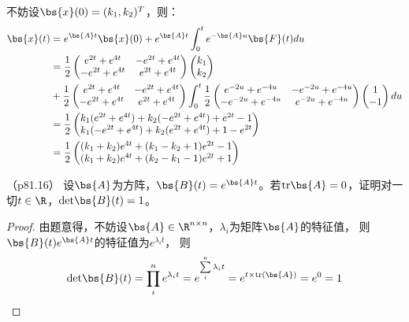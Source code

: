 \documentclass[12pt, a4paper, oneside, UTF8]{ctexbook}
\begin{document}
\begin{solution}
    不妨设$\bs{x}(0)=(k_1,k_2)^T$，则：
    \begin{align*}
        \bs{x}(t)&=e^{\bs{A}t}\bs{x}(0)+e^{\bs{A}t}\int_{0}^t e^{-\bs{A}u}\bs{F}(t) du\\
        &=\frac{1}{2}\begin{pmatrix}
            e^{2t}+e^{4t} & -e^{2t}+e^{4t}\\
        -e^{2t}+e^{4t}& e^{2t}+e^{4t}
        \end{pmatrix}\begin{pmatrix}
            k_1 \\
            k_2
        \end{pmatrix}\\
        &+\frac{1}{2}\begin{pmatrix}
            e^{2t}+e^{4t} & -e^{2t}+e^{4t}\\
            -e^{2t}+e^{4t}& e^{2t}+e^{4t}
        \end{pmatrix}\int_{0}^t
        \frac{1}{2}\begin{pmatrix}
            e^{-2u}+e^{-4u} & -e^{-2u}+e^{-4u}\\
            -e^{-2u}+e^{-4u}& e^{-2u}+e^{-4u}
        \end{pmatrix} \begin{pmatrix}
            1\\
            -1
        \end{pmatrix} du \\
        &=\frac{1}{2} \begin{pmatrix}
            k_1(e^{2t}+e^{4t})+k_2(-e^{2t}+e^{4t})+e^{2t}-1 \\
            k_1(-e^{2t}+e^{4t})+k_2(e^{2t}+e^{4t})+1-e^{2t}
        \end{pmatrix}\\
        &=\frac{1}{2} \begin{pmatrix}
           (k_1+k_2)e^{4t}+(k_1-k_2+1)e^{2t}-1 \\
            (k_1+k_2)e^{4t}+(k_2-k_1-1)e^{2t}+1
        \end{pmatrix}
        \end{align*}
\end{solution}


\begin{question}（p81.16）
    设$\bs{A}$为方阵，$\bs{B}(t)=e^{\bs{A}t}$。若$\mathrm{tr}\bs{A}=0$，证明对一切$t \in \R$，$\mathrm{det}\bs{B}(t)=1$。
\end{question}

\begin{proof}
    由题意得，不妨设$\bs{A}\in \R^{n\times n}$，$\lambda_i$为矩阵$\bs{A}$的特征值，
    则$\bs{B}(t)e^{\bs{A}t}$的特征值为$e^{\lambda_i t}$，
    则
    \begin{align*}
    \mathrm{det}\bs{B}(t)=\prod\limits_{i}^ne^{\lambda_i  t}=
    e^{\sum\limits_{i}^n \lambda_i t}=e^{t \times \mathrm{tr}(\bs{A})}=e^0=1
    \end{align*}
    
\end{proof}


\ifx\allfiles\undefined
\end{document}
